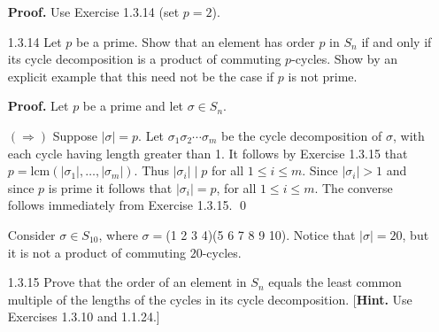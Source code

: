 \begin{enumerate}
      \textbf{Proof.} Use Exercise 1.3.14 (set $p = 2$).
   \item[1.3.14]  Let $p$ be a prime. Show that an element has order $p$ in
                  $S_n$ if and only if its cycle decomposition is a product of
                  commuting $p$-cycles. Show by an explicit example that this
                  need not be the case if $p$ is not prime.

      \textbf{Proof.} Let $p$ be a prime and let $\sigma \in S_n$.

      $(\Rightarrow)$ Suppose $|\sigma| = p$. Let
      $\sigma_1\sigma_2\cdots\sigma_m$ be the cycle decomposition of $\sigma$,
      with each cycle having length greater than 1. It follows by Exercise
      1.3.15 that $p = \text{lcm}(|\sigma_1|, \ldots, |\sigma_m|)$. Thus
      $|\sigma_i| \mid p$ for all $1 \le i \le m$. Since $|\sigma_i| > 1$ and
      since $p$ is prime it follows that $|\sigma_i| = p$, for all
      $1 \le i \le m$. The converse follows immediately from Exercise 1.3.15.
      \qed

      Consider $\sigma \in S_{10}$, where $\sigma = $(1 2 3 4)(5 6 7 8 9 10). 
      Notice that $|\sigma| = 20$, but it is not a product of commuting
      $20$-cycles.
   \item[1.3.15]  Prove that the order of an element in $S_n$ equals the least
                  common multiple of the lengths of the cycles in its cycle
                  decomposition.
                  [\textbf{Hint.} Use Exercises 1.3.10 and 1.1.24.]


\end{enumerate}
